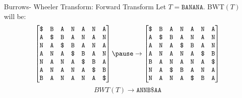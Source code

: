 \documentclass[mathserif]{beamer}
\begin{document}
\begin{frame}{Burrows- Wheeler Transform: Forward Transform}
    Let $T=\texttt{BANANA}$. BWT$(T)$ will be:
    \[
    \begin{bmatrix}
        \texttt{\$} &\texttt{B} &\texttt{A} &\texttt{N} &\texttt{A} &\texttt{N} &\texttt{A} \\
        \texttt{A} &\texttt{\$} &\texttt{B} &\texttt{A} &\texttt{N} &\texttt{A} &\texttt{N} \\
        \texttt{N} &\texttt{A} &\texttt{\$} &\texttt{B} &\texttt{A} &\texttt{N} &\texttt{A} \\
        \texttt{A} &\texttt{N} &\texttt{A} &\texttt{\$} &\texttt{B} &\texttt{A} &\texttt{N} \\
        \texttt{N} &\texttt{A} &\texttt{N} &\texttt{A} &\texttt{\$} &\texttt{B} &\texttt{A} \\
        \texttt{A} &\texttt{N} &\texttt{A} &\texttt{N} &\texttt{A} &\texttt{\$} &\texttt{B} \\
        \texttt{B} &\texttt{A} &\texttt{N} &\texttt{A} &\texttt{N} &\texttt{A} &\texttt{\$} \\
    \end{bmatrix} \pause 
    \rightarrow
    \begin{bmatrix}
        \texttt{\$} &\texttt{B} &\texttt{A} &\texttt{N} &\texttt{A} &\texttt{N} &\texttt{A} \\
        \texttt{A} &\texttt{\$} &\texttt{B} &\texttt{A} &\texttt{N} &\texttt{A} &\texttt{N} \\
        \texttt{A} &\texttt{N} &\texttt{A} &\texttt{\$} &\texttt{B} &\texttt{A} &\texttt{N} \\
        \texttt{A} &\texttt{N} &\texttt{A} &\texttt{N} &\texttt{A} &\texttt{\$} &\texttt{B} \\
        \texttt{B} &\texttt{A} &\texttt{N} &\texttt{A} &\texttt{N} &\texttt{A} &\texttt{\$} \\
        \texttt{N} &\texttt{A} &\texttt{\$} &\texttt{B} &\texttt{A} &\texttt{N} &\texttt{A} \\
        \texttt{N} &\texttt{A} &\texttt{N} &\texttt{A} &\texttt{\$} &\texttt{B} &\texttt{A} \\
    \end{bmatrix}\]
    \[
    BWT(T)\rightarrow \texttt{ANNB\$AA}
    \]

\end{frame}
\end{document}
